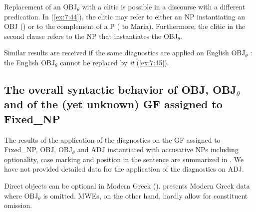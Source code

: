 \documentclass[output=paper]{langsci/langscibook}
\begin{document}
Replacement of an OBJ$_\theta$ with a clitic is possible in a discourse with a different predication. In (\ref{ex:7:44}), the clitic  may refer to either an NP instantiating an OBJ () or to the complement of a P ( {to Maria}). Furthermore, the  clitic  in the second clause refers to the NP  that instantiates the OBJ$_\theta$.

\z

Similar results are received if the same diagnostics are applied on English OBJ$_\theta$  \citep{thomas2012}:   the English OBJ$_\theta$ cannot be replaced by \textit{it} (\ref{ex:7:45}).

\begin{exe}%
\end{exe}

\subsection{The overall syntactic behavior of OBJ, OBJ$_\theta$ and of the (yet unknown) GF assigned to Fixed\_NP}

The results of the application of the diagnostics on the GF assigned to Fixed\_NP, OBJ, OBJ$_\theta$ and ADJ instantiated with accusative NPs  including optionality, case marking and position in the sentence are summarized in . We have not provided detailed data for the application of the diagnostics on ADJ.

Direct objects can be optional in Modern Greek (\citealt{anastasopoulos2013}). \citet{kordoni2004} presents Modern Greek data where OBJ$_\theta$ is omitted. MWEs, on the other hand, hardly allow for constituent omission.  
\end{document}
